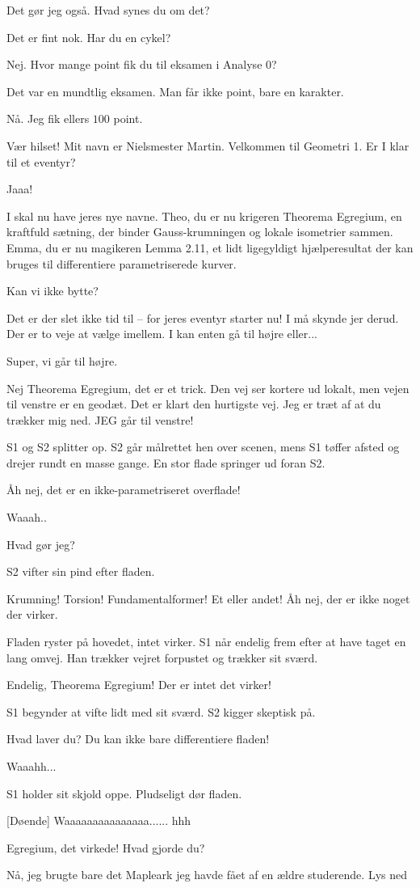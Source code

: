 \documentclass[a4paper, 11pt]{article}
\begin{document}
\begin{sketch}
 Det gør jeg også. Hvad synes du om det?

 Det er fint nok. Har du en cykel?

 Nej. Hvor mange point fik du til eksamen i Analyse 0?

 Det var en mundtlig eksamen. Man får ikke point, bare en karakter. 

 Nå. Jeg fik ellers $100$ point.

 Vær hilset! Mit navn er Nielsmester Martin. Velkommen til Geometri 1. Er I klar til et eventyr?

 Jaaa!

 I skal nu have jeres nye navne. Theo, du er nu krigeren Theorema Egregium, en kraftfuld sætning, der binder Gauss-krumningen og lokale isometrier sammen. Emma, du er nu magikeren Lemma 2.11, et lidt ligegyldigt hjælperesultat der kan bruges til differentiere parametriserede kurver.

 Kan vi ikke bytte? 

 Det er der slet ikke tid til – for jeres eventyr starter nu! I må skynde jer derud. Der er to veje at vælge imellem. I kan enten gå til højre eller...

 Super, vi går til højre.

 Nej Theorema Egregium, det er et trick. Den vej ser kortere ud lokalt, men vejen til venstre er en geodæt. Det er klart den hurtigste vej. Jeg er træt af at du trækker mig ned. JEG går til venstre!

\scene S1 og S2 splitter op. S2 går målrettet hen over scenen, mens S1 tøffer afsted og drejer rundt en masse gange. En stor flade springer ud foran S2.

 Åh nej, det er en ikke-parametriseret overflade! 

 Waaah..

 Hvad gør jeg?

\scene S2 vifter sin pind efter fladen.

 Krumning! Torsion! Fundamentalformer! Et eller andet! Åh nej, der er ikke noget der virker. 

\scene Fladen ryster på hovedet, intet virker. S1 når endelig frem efter at have taget en lang omvej. Han trækker vejret forpustet og trækker sit sværd.

 Endelig, Theorema Egregium! Der er intet det virker!

\scene S1 begynder at vifte lidt med sit sværd. S2 kigger skeptisk på.

 Hvad laver du? Du kan ikke bare differentiere fladen!

 Waaahh... 

\scene S1 holder sit skjold oppe. Pludseligt dør fladen.

[Døende] Waaaaaaaaaaaaaaa...... hhh

 Egregium, det virkede! Hvad gjorde du?

 Nå, jeg brugte bare det Mapleark jeg havde fået af en ældre studerende.
\scene Lys ned
\end{sketch}
\end{document}
